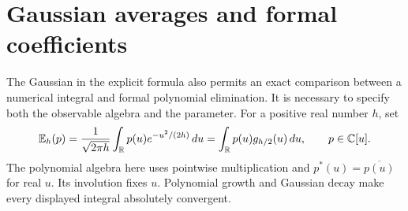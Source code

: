 \section{Gaussian averages and formal coefficients}
\label{sec:weil-gaussian-coefficients}

The Gaussian in the explicit formula also permits an exact comparison
between a numerical integral and formal polynomial elimination.
It is necessary to specify both the observable algebra and the parameter.
For a positive real number $h$, set
\[
 \mathbb E_h(p)=\frac1{\sqrt{2\pi h}}
       \int_{\mathbb R}p(u)e^{-u^2/(2h)}\,du
       =\int_{\mathbb R}p(u)g_{h/2}(u)\,du,
 \qquad p\in\mathbb C[u].
\]
The polynomial algebra here uses pointwise multiplication and
$p^*(u)=\overline{p(u)}$ for real $u$.
Its involution fixes $u$.  Polynomial growth and Gaussian decay make
every displayed integral absolutely convergent.


